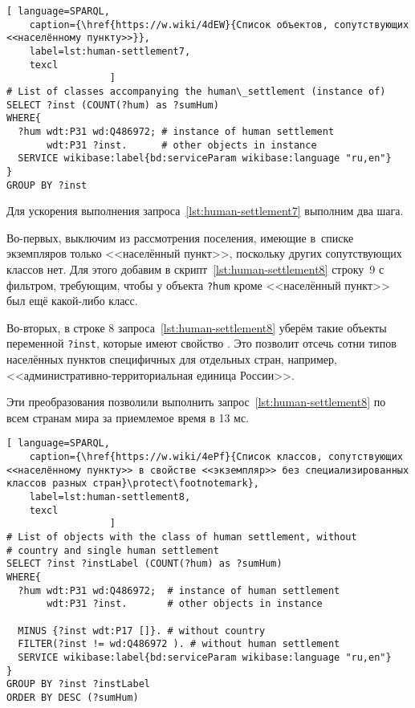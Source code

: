 \begin{lstlisting}[ language=SPARQL, 
    caption={\href{https://w.wiki/4dEW}{Cписок объектов, сопутствующих <<населённому пункту>>}},
    label=lst:human-settlement7,
    texcl 
                  ]
# List of classes accompanying the human\_settlement (instance of)
SELECT ?inst (COUNT(?hum) as ?sumHum) 
WHERE{          
  ?hum wdt:P31 wd:Q486972; # instance of human settlement
       wdt:P31 ?inst.      # other objects in instance
  SERVICE wikibase:label{bd:serviceParam wikibase:language "ru,en"}
}  
GROUP BY ?inst
\end{lstlisting}%

Для ускорения выполнения запроса~\ref{lst:human-settlement7} выполним два шага.
 
Во-первых, выключим из рассмотрения поселения, 
имеющие в~списке экземпляров только <<населённый пункт>>, 
поскольку других сопутствующих классов нет. 
Для этого добавим в скрипт~\ref{lst:human-settlement8} строку~\num{9} с фильтром, 
требующим, чтобы у объекта \lstinline|?hum| 
кроме  <<населённый пункт>> был ещё какой-либо класс.

Во-вторых, в строке \num{8} запроса~\ref{lst:human-settlement8} 
уберём такие объекты переменной \lstinline|?inst|, 
которые имеют свойство . 
Это позволит отсечь сотни типов населённых пунктов специфичных для отдельных стран, 
например, <<административно-территориальная единица России>>.

Эти преобразования позволили выполнить запрос~\ref{lst:human-settlement8} 
по всем странам мира за приемлемое время в 13 мс.

\lstset{numbers=left, firstnumber=1, frame=single}
\begin{lstlisting}[ language=SPARQL, 
    caption={\href{https://w.wiki/4ePf}{Cписок классов, сопутствующих <<населённому пункту>> в свойстве <<экземпляр>> без специализированных классов разных стран}\protect\footnotemark},
    label=lst:human-settlement8,
    texcl 
                  ]
# List of objects with the class of human settlement, without 
# country and single human settlement
SELECT ?inst ?instLabel (COUNT(?hum) as ?sumHum) 
WHERE{ 
  ?hum wdt:P31 wd:Q486972;  # instance of human settlement
       wdt:P31 ?inst.       # other objects in instance
  
  MINUS {?inst wdt:P17 []}. # without country
  FILTER(?inst != wd:Q486972 ). # without human settlement
  SERVICE wikibase:label{bd:serviceParam wikibase:language "ru,en"}
}  
GROUP BY ?inst ?instLabel
ORDER BY DESC (?sumHum)
\end{lstlisting}%

